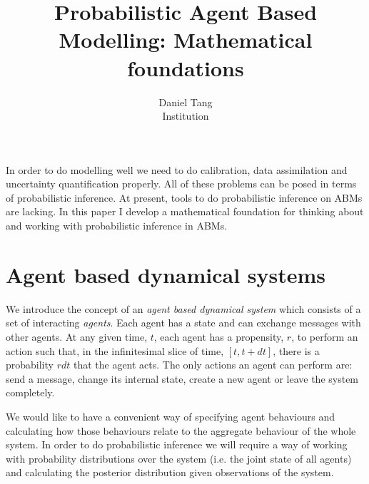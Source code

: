 \documentclass[letterpaper,twocolumn,10pt]{article}
\begin{document}
\title{\Large \bf Probabilistic Agent Based Modelling: Mathematical foundations}

\author{
{\rm Daniel Tang}\\
Institution
}

\maketitle


\abstract
In order to do modelling well we need to do calibration, data assimilation and uncertainty quantification properly. All of these problems can be posed in terms of probabilistic inference. At present, tools to do probabilistic inference on ABMs are lacking. In this paper I develop a mathematical foundation for thinking about and working with probabilistic inference in ABMs.

\section{Agent based dynamical systems}
We introduce the concept of an \textit{agent based dynamical system} which consists of a set of interacting \textit{agents}. Each agent has a state and can exchange messages with other agents. At any given time, $t$, each agent has a propensity, $r$, to perform an action such that, in the infinitesimal slice of time, $[t, t+dt]$, there is a probability $rdt$ that the agent acts. The only actions an agent can perform are: send a message, change its internal state, create a new agent or leave the system completely.

We would like to have a convenient way of specifying agent behaviours and calculating how those behaviours relate to the aggregate behaviour of the whole system. In order to do probabilistic inference we will require a way of working with probability distributions over the system (i.e. the joint state of all agents) and calculating the posterior distribution given observations of the system.
\end{document}
